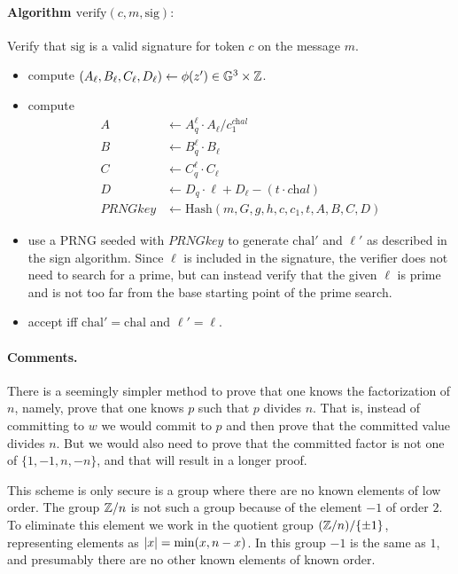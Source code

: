 \documentclass[11pt]{article}
\begin{document}
\paragraph{Algorithm $\text{verify}(c, m, \text{sig}):$}
Verify that $\text{sig}$ is a valid signature for
token $c$ on the message $m$.
\begin{itemize}
\item compute $(A_\ell, B_\ell, C_\ell, D_\ell) \gets \phi(z') \in \mathbb G^3 \times \mathbb Z$.
\item compute 
\begin{align*}
     A & \gets A_q^\ell \cdot A_\ell  / c_1^{\textit{chal}} \\
     B & \gets B_q^\ell \cdot B_\ell  \\
     C & \gets C_q^\ell \cdot C_\ell  \\
     D & \gets D_q \cdot \ell + D_\ell - (t \cdot \textit{chal}) \\
     \textit{PRNGkey} & \gets \text{Hash}(m, G, g, h, c, c_1, t, A, B, C, D)
\end{align*}

\item use a PRNG seeded with $\textit{PRNGkey}$ to generate $\text{chal}'$ and
  $\ell'$ as described in the sign algorithm. Since $\ell$ is
  included in the signature, the verifier does not need to search for
  a prime, but can instead verify that the given $\ell$ is prime and
  is not too far from the base starting point of the prime search.

\item accept iff $\text{chal}' = \text{chal}$ and $\ell' = \ell$.
\end{itemize}



\paragraph{Comments.}
There is a seemingly simpler method to prove that one knows the
factorization of $n$, namely, prove that one knows $p$ such that $p$
divides $n$.  That is, instead of committing to $w$ we would commit to
$p$ and then prove that the committed value divides $n$. But we would
also need to prove that the committed factor is not one of 
$\{1, -1, n, -n\}$, and that will result in a longer proof.

This scheme is only secure is a group where there are no known
elements of low order.  The group $\mathbb Z/n$ is not such a group because
of the element $-1$ of order $2$.  To eliminate this element we work
in the quotient group $(\mathbb Z/n)/\{\pm 1\}$, representing elements as
$\lvert x \rvert = \min(x, n - x)$.  In this group $-1$ is the same as $1$,
and presumably there are no other known elements of known order.
\end{document}
